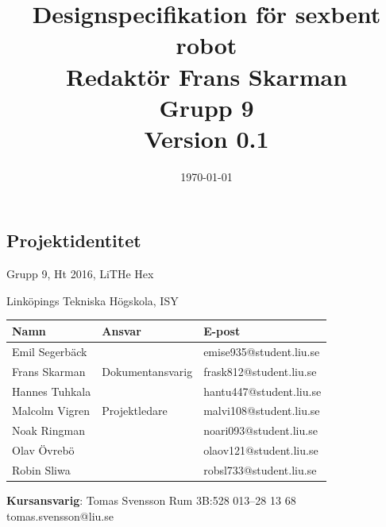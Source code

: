 \documentclass[a4paper,titlepage,12pt]{article}
\begin{document}
	\title{\LARGE
		\textbf{Designspecifikation för sexbent robot} \\
		\vspace*{0.5\baselineskip}
		\large
		Redaktör Frans Skarman \\
		Grupp 9 \\
		\small
		\vspace*{0.5\baselineskip}
		Version 0.1}

	\date{\today}

	\maketitle
	
	\newpage
	
	\begin{center}


		\section*{Projektidentitet}
		Grupp 9, Ht 2016, LiTHe Hex

		Linköpings Tekniska Högskola, ISY

		\renewcommand*{\arraystretch}{1.4}
		\begin{longtable}[c]{ l l l }
			\textbf{Namn} & \textbf{Ansvar} & \textbf{E-post} \\ \midrule
			Emil Segerbäck & & emise935@student.liu.se \\ \midrule
			Frans Skarman & Dokumentansvarig & frask812@student.liu.se \\ \midrule
			Hannes Tuhkala & & hantu447@student.liu.se \\ \midrule
			Malcolm Vigren & Projektledare & malvi108@student.liu.se \\ \midrule
			Noak Ringman &  & noari093@student.liu.se \\ \midrule
			Olav Övrebö &  & olaov121@student.liu.se \\ \midrule
			Robin Sliwa &  & robsl733@student.liu.se \\
		\end{longtable}

		\centering
		\textbf{Kursansvarig}: Tomas Svensson Rum 3B:528 013--28 13 68 tomas.svensson@liu.se

		\newpage
		\tableofcontents
		\newpage



\end{center}
\end{document}
